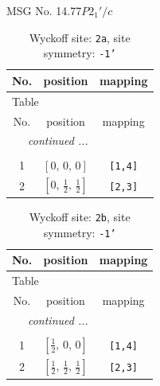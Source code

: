 \documentclass[fleqn,8pt]{jsarticle}
\begin{document}
\setcounter{MaxMatrixCols}{32}

\renewcommand{\tablename}{Table~}
\renewcommand{\figurename}{Figure~}
\begin{center}
\LARGE
MSG No. 14.77\quad$P2_{1}'/c$
\end{center}
\renewcommand{\arraystretch}{1.2}
\begin{longtable}{ccc}
\caption{Wyckoff site: {\tt 2a}, site symmetry: {\tt -1'}}
 \\
 \hline \hline
No. & position & mapping \\ \hline \endfirsthead

\multicolumn{2}{l}{\tablename\ \thetable{}} \\
 \hline \hline
No. & position & mapping \\ \hline \endhead

 \hline \hline
\multicolumn{2}{r}{\footnotesize\it continued ...} \\ \endfoot

 \hline \hline
\multicolumn{2}{r}{} \\ \endlastfoot

1 & $\left[ 0,\, 0,\, 0 \right]$ & {\tt [1,4]} \\ \hline
2 & $\left[ 0,\, \frac{1}{2},\, \frac{1}{2} \right]$ & {\tt [2,3]} \\
\end{longtable}
\renewcommand{\arraystretch}{1.2}
\begin{longtable}{ccc}
\caption{Wyckoff site: {\tt 2b}, site symmetry: {\tt -1'}}
 \\
 \hline \hline
No. & position & mapping \\ \hline \endfirsthead

\multicolumn{2}{l}{\tablename\ \thetable{}} \\
 \hline \hline
No. & position & mapping \\ \hline \endhead

 \hline \hline
\multicolumn{2}{r}{\footnotesize\it continued ...} \\ \endfoot

 \hline \hline
\multicolumn{2}{r}{} \\ \endlastfoot

1 & $\left[ \frac{1}{2},\, 0,\, 0 \right]$ & {\tt [1,4]} \\ \hline
2 & $\left[ \frac{1}{2},\, \frac{1}{2},\, \frac{1}{2} \right]$ & {\tt [2,3]} \\
\end{longtable}
\renewcommand{\arraystretch}{1.2}
\end{document}
